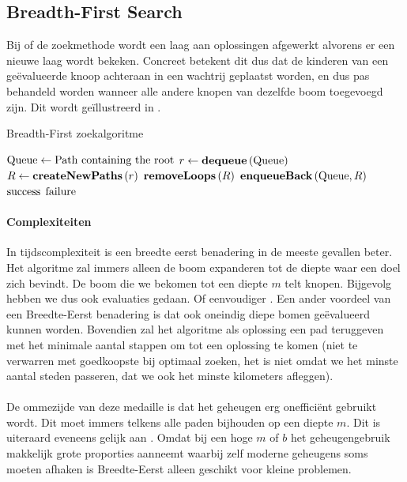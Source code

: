 \subsection{Breadth-First Search}
Bij  of de  zoekmethode wordt een laag aan oplossingen afgewerkt alvorens er een nieuwe laag wordt bekeken. Concreet betekent dit dus dat de kinderen van een ge\"evalueerde knoop achteraan in een wachtrij geplaatst worden, en dus pas behandeld worden wanneer alle andere knopen van dezelfde boom toegevoegd zijn. Dit wordt ge\"illustreerd in .
\begin{algorithm}[htb]                      %
\caption{Breadth-First zoekalgoritme}          %
\label{alg:breadthFirst}                           %
\begin{algorithmic}[1]                    %
\STATE $\mbox{Queue}\leftarrow\mbox{Path containing the root}$
\WHILE{$\notempty{\queue}\wedge\neg\goalreached{\queue}$}
\STATE $r\leftarrow\mbox{\bf dequeue}\left( \mbox{Queue} \right)$
\STATE $R\leftarrow\mbox{\bf createNewPaths}\left( r \right)$
\STATE $\mbox{\bf removeLoops}\left( R \right)$
\STATE $\mbox{\bf enqueueBack}\left( \mbox{Queue},R \right)$
\ENDWHILE
\IF{$\goalreached{\queue}$}
\RETURN $\mbox{success}$
\ELSE
\RETURN $\mbox{failure}$
\ENDIF
\end{algorithmic}
\end{algorithm}
\paragraph{Complexiteiten}
In tijdscomplexiteit is een breedte eerst benadering in de meeste gevallen beter. Het algoritme zal immers alleen de boom expanderen tot de diepte waar een doel zich bevindt. De boom die we bekomen tot een diepte $m$ telt  knopen. Bijgevolg hebben we dus ook  evaluaties gedaan. Of eenvoudiger . Een ander voordeel van een Breedte-Eerst benadering is dat ook oneindig diepe bomen ge\"evalueerd kunnen worden. Bovendien zal het algoritme als oplossing een pad teruggeven met het minimale aantal stappen om tot een oplossing te komen (niet te verwarren met goedkoopste bij optimaal zoeken, het is niet omdat we het minste aantal steden passeren, dat we ook het minste kilometers afleggen).
\paragraph{}
De ommezijde van deze medaille is dat het geheugen erg oneffici\"ent gebruikt wordt. Dit moet immers telkens alle paden bijhouden op een diepte $m$. Dit is uiteraard eveneens gelijk aan . Omdat bij een hoge $m$ of $b$ het geheugengebruik makkelijk grote proporties aanneemt waarbij zelf moderne geheugens soms moeten afhaken is Breedte-Eerst alleen geschikt voor kleine problemen.

